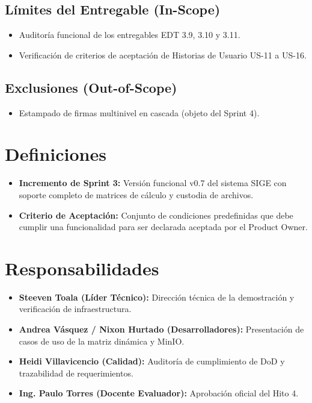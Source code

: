 \documentclass[12pt,a4paper]{article}
\begin{document}
\subsection{Límites del Entregable (In-Scope)}
\begin{itemize}[leftmargin=1.5em, itemsep=2pt]
    \item Auditoría funcional de los entregables EDT 3.9, 3.10 y 3.11.
    \item Verificación de criterios de aceptación de Historias de Usuario US-11 a US-16.
\end{itemize}
\subsection{Exclusiones (Out-of-Scope)}
\begin{itemize}[leftmargin=1.5em, itemsep=2pt]
    \item Estampado de firmas multinivel en cascada (objeto del Sprint 4).
\end{itemize}

\section{Definiciones}
\begin{itemize}[leftmargin=1.5em, itemsep=2pt]
    \item \textbf{Incremento de Sprint 3:} Versión funcional v0.7 del sistema SIGE con soporte completo de matrices de cálculo y custodia de archivos.
    \item \textbf{Criterio de Aceptación:} Conjunto de condiciones predefinidas que debe cumplir una funcionalidad para ser declarada aceptada por el Product Owner.
\end{itemize}

\section{Responsabilidades}
\begin{itemize}[leftmargin=1.5em, itemsep=2pt]
    \item \textbf{Steeven Toala (Líder Técnico):} Dirección técnica de la demostración y verificación de infraestructura.
    \item \textbf{Andrea Vásquez / Nixon Hurtado (Desarrolladores):} Presentación de casos de uso de la matriz dinámica y MinIO.
    \item \textbf{Heidi Villavicencio (Calidad):} Auditoría de cumplimiento de DoD y trazabilidad de requerimientos.
    \item \textbf{Ing. Paulo Torres (Docente Evaluador):} Aprobación oficial del Hito 4.
\end{itemize}
\end{document}
